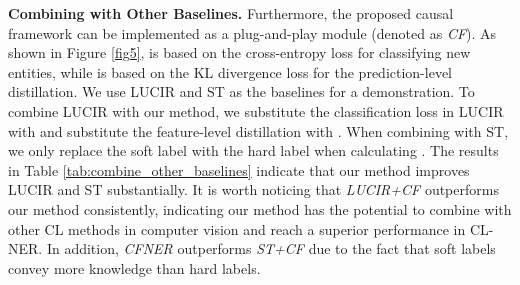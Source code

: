 \documentclass[11pt]{article}
\begin{document}
\begin{table}[htbp]
  \centering
  \caption{Combining our methods with other baselines on three datasets in the setting FG-1-PG-1. \textit{Mi-F1}: micro-F1; \textit{Ma-F1}: macro-F1. \textit{CF} represents applying causal effects.}
  \label{tab:combine_other_baselines}\end{table}

\noindent\textbf{Combining with Other Baselines.}\quad
Furthermore, the proposed causal framework can be implemented as a plug-and-play module (denoted as \textit{CF}).
As shown in Figure \ref{fig5},  is based on the cross-entropy loss for classifying new entities, while  is based on the KL divergence loss for the prediction-level distillation.
We use LUCIR and ST as the baselines for a demonstration.
To combine LUCIR with our method, we substitute the classification loss in LUCIR with  and substitute the feature-level distillation with .
When combining with ST, we only replace the soft label with the hard label when calculating .
The results in Table \ref{tab:combine_other_baselines} indicate that our method improves LUCIR and ST substantially.
It is worth noticing that \textit{LUCIR+CF} outperforms our method consistently, indicating our method has the potential to combine with other CL methods in computer vision and reach a superior performance in CL-NER. 
In addition, \textit{CFNER} outperforms \textit{ST+CF} due to the fact that soft labels convey more knowledge than hard labels.
\end{document}
